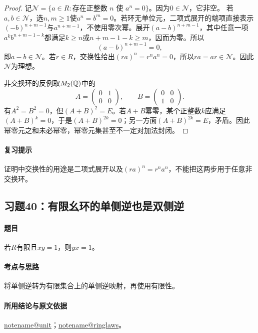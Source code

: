 \documentclass[UTF8,a4paper,11pt,fontset=windows]{ctexart}
\makeatletter
\newcommand{\noteref}[1]{\hyperref[note:#1]{\csname notename@#1\endcsname}}
\newcommand{\exref}[2]{\hyperref[ex:#1:#2]{第#1章习题#2}}
\makeatother
\begin{document}

\begin{proof}
记$\mathcal N=\{a\in R:\text{存在正整数 }n\text{ 使 }a^n=0\}$。因为$0\in\mathcal N$，它非空。
若$a,b\in\mathcal N$，选$n,m\geq1$使$a^n=b^m=0$。若环无单位元，二项式展开的端项直接表示$(-b)^{n+m-1}$与$a^{n+m-1}$，不使用零次幂。展开$(a-b)^{n+m-1}$，其中任意一项$a^k b^{n+m-1-k}$都满足$k\geq n$或$n+m-1-k\geq m$，因而为零。所以
\[
(a-b)^{n+m-1}=0,
\]
即$a-b\in\mathcal N$。若$r\in R$，交换性给出$(ra)^n=r^na^n=0$，所以$ra=ar\in\mathcal N$。因此$\mathcal N$为理想。

非交换环的反例取$M_2(\mathbb Q)$中的
\[
A=\begin{pmatrix}0&1\\0&0\end{pmatrix},\qquad
B=\begin{pmatrix}0&0\\1&0\end{pmatrix}.
\]
有$A^2=B^2=0$，但$(A+B)^2=E$。若$A+B$幂零，某个正整数$k$应满足$(A+B)^k=0$，于是$(A+B)^{2k}=0$；另一方面$(A+B)^{2k}=E$，矛盾。因此幂零元之和未必幂零，幂零元集甚至不一定对加法封闭。
\end{proof}

\paragraph{复习提示}
证明中交换性的用途是二项式展开以及$(ra)^n=r^na^n$，不能把这两步用于任意非交换环。


\subsection{习题40：\texorpdfstring{有限幺环的单侧逆也是双侧逆}{有限幺环的单侧逆也是双侧逆}}
\label{ex:1:40}

\paragraph{题目}
若$R$有限且$xy=1$，则$yx=1$。

\paragraph{考点与思路}
将单侧逆转为有限集合上的单侧逆映射，再使用有限性。

\paragraph{所用结论与原文依据}
\noteref{unit}；\noteref{ringlaws}。
\end{document}
